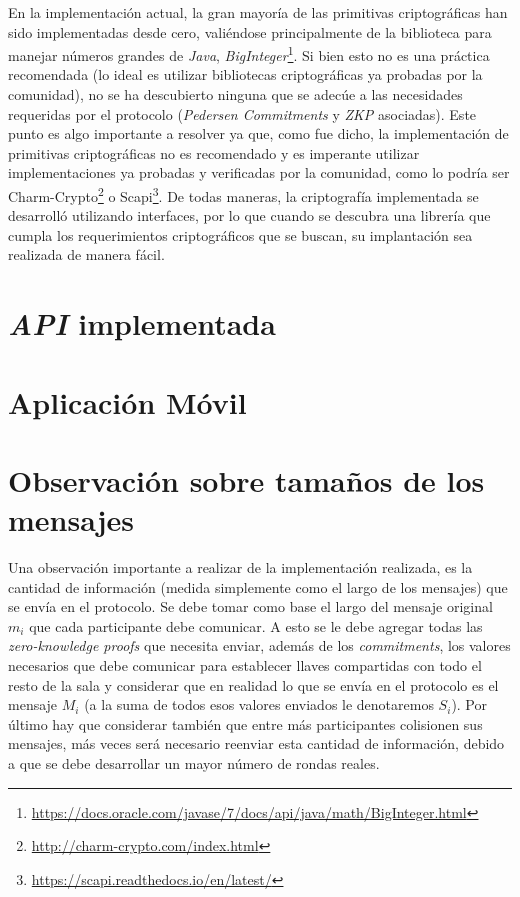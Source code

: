 En la implementación actual, la gran mayoría de las primitivas criptográficas han sido implementadas desde cero, valiéndose principalmente de la biblioteca para manejar números grandes de \emph{Java}, \emph{BigInteger}\footnote{\url{https://docs.oracle.com/javase/7/docs/api/java/math/BigInteger.html}}. Si bien esto no es una práctica recomendada (lo ideal es utilizar bibliotecas criptográficas ya probadas por la comunidad), no se ha descubierto ninguna que se adecúe a las necesidades requeridas por el protocolo (\emph{Pedersen Commitments} y \emph{ZKP} asociadas). Este punto es algo importante a resolver ya que, como fue dicho, la implementación de primitivas criptográficas no es recomendado y es imperante utilizar implementaciones ya probadas y verificadas por la comunidad, como lo podría ser Charm-Crypto\footnote{\url{http://charm-crypto.com/index.html}} o Scapi\footnote{\url{https://scapi.readthedocs.io/en/latest/}}. De todas maneras, la criptografía implementada se desarrolló utilizando interfaces, por lo que cuando se descubra una librería que cumpla los requerimientos criptográficos que se buscan, su implantación sea realizada de manera fácil.

\section{\emph{API} implementada}
\section{Aplicación Móvil}
\section{Observación sobre tamaños de los mensajes}

Una observación importante a realizar de la implementación realizada, es la cantidad de información (medida simplemente como el largo de los mensajes) que se envía en el protocolo. Se debe tomar como base el largo del mensaje original $m_i$ que cada participante debe comunicar. A esto se le debe agregar todas las \emph{zero-knowledge proofs} que necesita enviar, además de los \emph{commitments}, los valores necesarios que debe comunicar para establecer llaves compartidas con todo el resto de la sala y considerar que en realidad lo que se envía en el protocolo es el mensaje $M_i$ (a la suma de todos esos valores enviados le denotaremos $S_i$). Por último hay que considerar también que entre más participantes colisionen sus mensajes, más veces será necesario reenviar esta cantidad de información, debido a que se debe desarrollar un mayor número de rondas reales.


